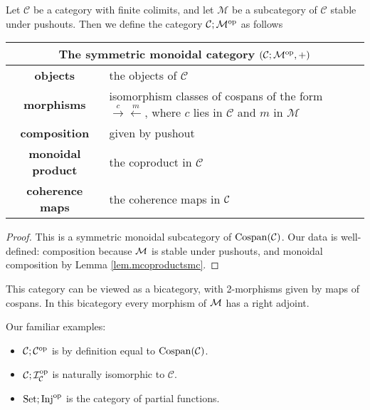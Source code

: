 \begin{proposition}
  Let $\mathcal C$ be a category with finite colimits, and let $\mathcal M$ be a
  subcategory of $\mathcal C$ stable under pushouts. Then we define the category
  $\mathcal C; \mathcal M^{\mathrm{op}}$ as follows  
  \begin{center}
    \begin{tabular}{| c | p{} |}
      \hline
      \multicolumn{2}{|c|}{The symmetric monoidal category $(\mathcal C;\mathcal M^{\mathrm{op}},+)$} \\
      \hline
      \textbf{objects} & the objects of $\mathcal C$ \\ 
      \textbf{morphisms} & isomorphism classes of cospans of the form
      $\stackrel{c}\rightarrow \stackrel{m}\leftarrow$, where $c$ lies in
      $\mathcal C$ and $m$ in $\mathcal M$\\ 
      \textbf{composition} & given by pushout \\
      \textbf{monoidal product} & the coproduct in $\mathcal C$ \\
      \textbf{coherence maps} & the coherence maps in $\mathcal C$ \\
      \hline
    \end{tabular}
  \end{center}
\end{proposition}
\begin{proof}
  This is a symmetric monoidal subcategory of $\operatorname{{Cospan}}(\mathcal C)$. Our data is
  well-defined: composition because $\mathcal M$ is stable under pushouts, and
  monoidal composition by Lemma \ref{lem.mcoproductsmc}. 
\end{proof}

This category can be viewed as a bicategory, with 2-morphisms given by maps of
cospans. In this bicategory every morphism of $\mathcal M$ has a right adjoint.

\begin{examples} 
  Our familiar examples:
  \begin{itemize}
    \item $\mathcal C; \mathcal C^{\mathrm{op}}$ is by definition equal to
$\operatorname{{Cospan}}(\mathcal C)$.
\item $\mathcal C;\mathcal I_{\mathcal C}^{\mathrm{op}}$ is
naturally isomorphic to $\mathcal C$.
\item $\mathrm{Set};\mathrm{Inj}^{\mathrm{op}}$ is the category of partial functions.
\end{itemize}
\end{examples}

